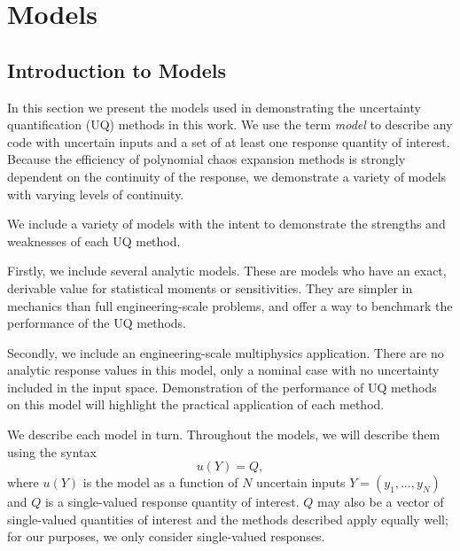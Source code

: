 
\chapter{Models} %

\label{ch:models} %



\section{Introduction to Models}
In this section we present the models used in demonstrating the uncertainty quantification (UQ) methods in this
work.  We use the term \emph{model} to describe any code with uncertain inputs and a set of at least one
response quantity of interest.  Because the efficiency of polynomial chaos expansion methods is strongly dependent on the continuity
of the response, we demonstrate a variety of models with varying levels of continuity.

We include a variety of models with the intent to demonstrate the strengths and weaknesses of each UQ
method.

Firstly, we include several analytic models.  These are models who have an exact, derivable value for
statistical moments or sensitivities.  They are simpler in mechanics than full engineering-scale problems, and
offer a way to benchmark the performance of the UQ methods.

Secondly, we include an engineering-scale multiphysics application.  There are no analytic response values in
this model, only a nominal case with no uncertainty included in the input space.  Demonstration of the
performance of UQ methods on this model will highlight the practical application of each method.

We describe each model in turn.  Throughout the models, we will describe them using the syntax
\begin{equation}
  u(Y) = Q,
\end{equation}
where $u(Y)$ is the model as a function of $N$ uncertain inputs $Y=(y_1,\ldots,y_N)$ and $Q$ is a
single-valued response quantity of interest.  $Q$ may also be a vector of single-valued quantities of interest and the methods
described apply equally well; for our purposes, we only consider single-valued responses.

